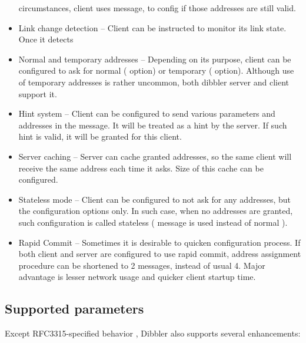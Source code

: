 \begin{itemize}
      circumstances, client uses  message, to config if
      those addresses are still valid.
\item Link change detection -- Client can be instructed to monitor its
      link state. Once it detects
\item Normal and temporary addresses -- Depending on its purpose,
      client can be configured to ask for normal ( option)
      or temporary ( option). Although use of temporary
      addresses is rather uncommon, both dibbler server and client
      support it.
\item Hint system -- Client can be configured to send various parameters
      and addresses in the  message. It will be treated as
      a hint by the server. If such hint is valid, it will be granted
      for this client.
\item Server caching -- Server can cache granted addresses, so the same
      client will receive the same address each time it asks. Size of
      this cache can be configured.
\item Stateless mode -- Client can be configured to not ask for any
      addresses, but the configuration options only. In such case, when
      no addresses are granted, such configuration is called stateless
      ( message is used instead of normal
      ).
\item Rapid Commit -- Sometimes it is desirable to quicken configuration
      process. If both client and server are configured to use rapid
      commit, address assignment procedure can be shortened to 2
      messages, instead of usual 4. Major advantage is lesser network
      usage and quicker client startup time.
\end{itemize}

\subsection{Supported parameters}
Except RFC3315-specified behavior \cite{rfc3315}, Dibbler also supports
several enhancements:

